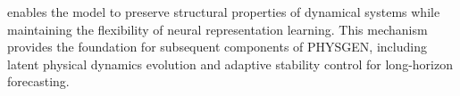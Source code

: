 enables the model to preserve structural properties of dynamical systems while maintaining the flexibility of neural representation learning. This mechanism provides the foundation for subsequent components of PHYSGEN, including latent physical dynamics evolution and adaptive stability control for long-horizon forecasting. \] 